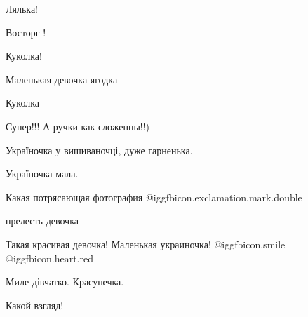  
 
 
 
 

Лялька!

Восторг !

Куколка!

Маленькая девочка\hyp ягодка

Куколка

Супер!!! А ручки как сложенны!!)

Україночка у вишиваночці, дуже гарненька.

Україночка мала.

Какая потрясающая фотография @igg{fbicon.exclamation.mark.double}

прелесть девочка

Такая красивая девочка! Маленькая украиночка! @igg{fbicon.smile} @igg{fbicon.heart.red}

Миле дівчатко. Красунечка.

Какой взгляд!
